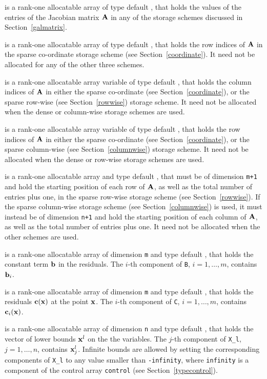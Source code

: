 \documentclass{galahad}
\begin{document}
\begin{description}
\begin{description}
 is a rank-one allocatable array of type default \realdp, that holds
the values of the entries of the Jacobian matrix ${\mathbf{A}}$ in any of the
storage schemes discussed in Section~\ref{galmatrix}.

 is a rank-one allocatable array of type default \integer,
that holds the row indices of ${\mathbf{A}}$ in the sparse co-ordinate storage
scheme (see Section~\ref{coordinate}).
It need not be allocated for any of the other three schemes.

 is a rank-one allocatable array variable of type default \integer,
that holds the column indices of ${\mathbf{A}}$ in either the sparse co-ordinate
(see Section~\ref{coordinate}), or the sparse row-wise
(see Section~\ref{rowwise}) storage scheme.
It need not be allocated when the dense or column-wise storage schemes are used.

 is a rank-one allocatable array variable of type default \integer,
that holds the row indices of ${\mathbf{A}}$ in either the sparse co-ordinate
(see Section~\ref{coordinate}), or the sparse column-wise
(see Section~\ref{columnwise}) storage scheme.
It need not be allocated when the dense or row-wise storage schemes are used.

 is a rank-one allocatable array and type default \integer,
that must be of dimension {\tt m+1}
and hold the starting position of each row of ${\mathbf{A}}$, as well
as the total number of entries plus one, in the sparse row-wise storage
scheme (see Section~\ref{rowwise}).
If the sparse column-wise storage scheme (see Section~\ref{columnwise})
is used, it must instead be of dimension {\tt n+1}
and hold the starting position of each column of ${\mathbf{A}}$, as well
as the total number of entries plus one.
It need not be allocated when the
other schemes are used.

\end{description}

 is a rank-one allocatable array of dimension {\tt m} and type
default \realdp, that holds the constant term ${\mathbf{b}}$ in the residuals.
The $i$-th component of {\tt B}, $i = 1, \ldots, m$, contains ${\mathbf{b}}_{i}$.

 is a rank-one allocatable array of dimension {\tt m} and type
default \realdp, that holds the residuals ${\mathbf{c}}({\mathbf{x}})$
at the point ${\mathbf{x}}$. The $i$-th component of
{\tt C}, $i = 1, \ldots, m$, contains ${\mathbf{c}}_{i}({\mathbf{x}})$.

 is a rank-one allocatable array of dimension {\tt n} and type
default \realdp, that holds
the vector of lower bounds ${\mathbf{x}}^{l}$ on the the variables.
The $j$-th component of {\tt X\_l}, $j = 1, \ldots , n$,
contains ${\mathbf{x}}_{j}^{l}$.
Infinite bounds are allowed by setting the corresponding
components of {\tt X\_l} to any value smaller than {\tt -infinity},
where {\tt infinity} is a component of the control array {\tt control}
(see Section~\ref{typecontrol}).


\end{description}
\end{document}

